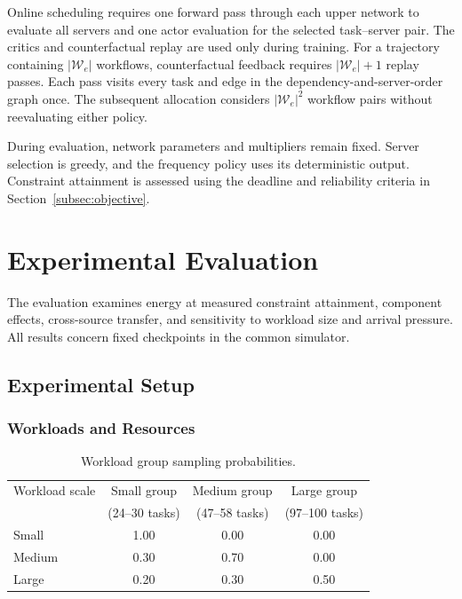 \documentclass[journal]{IEEEtran}
\begin{document}
Online scheduling requires one forward pass through each upper network to evaluate all servers and one actor evaluation for the selected task--server pair. The critics and counterfactual replay are used only during training. For a trajectory containing $|\mathcal W_e|$ workflows, counterfactual feedback requires $|\mathcal W_e|+1$ replay passes. Each pass visits every task and edge in the dependency-and-server-order graph once. The subsequent allocation considers $|\mathcal W_e|^2$ workflow pairs without reevaluating either policy.

During evaluation, network parameters and multipliers remain fixed. Server selection is greedy, and the frequency policy uses its deterministic output. Constraint attainment is assessed using the deadline and reliability criteria in Section~\ref{subsec:objective}.

\section{Experimental Evaluation}
\label{sec:experiments}
The evaluation examines energy at measured constraint attainment, component effects, cross-source transfer, and sensitivity to workload size and arrival pressure. All results concern fixed checkpoints in the common simulator.
\subsection{Experimental Setup}
\label{subsec:experimental_setup}

\subsubsection{Workloads and Resources}

\begin{table}[t]
\centering
\caption{Workload group sampling probabilities.}
\label{tab:workflow_composition}
\footnotesize
\setlength{\tabcolsep}{5pt}
\renewcommand{\arraystretch}{1.08}
\begin{tabular}{@{}lccc@{}}
\toprule
Workload scale
& Small group
& Medium group
& Large group \\
& (24--30 tasks)
& (47--58 tasks)
& (97--100 tasks) \\
\midrule
Small  & 1.00 & 0.00 & 0.00 \\
Medium & 0.30 & 0.70 & 0.00 \\
Large  & 0.20 & 0.30 & 0.50 \\
\bottomrule
\end{tabular}
\end{table}
\end{document}
